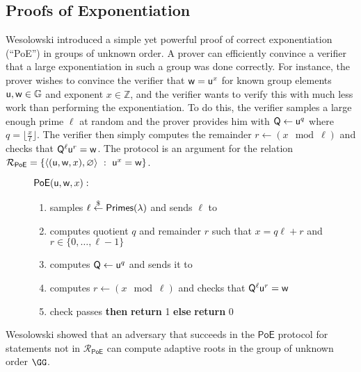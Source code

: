 \documentclass{article}
\theoremstyle{definition}
\begin{document}
\subsection{Proofs of Exponentiation}
Wesolowski \cite{EC:Wesolowski19} introduced a simple yet powerful proof of correct exponentiation (``PoE'') in groups of unknown order. A prover can efficiently convince a verifier that a large exponentiation in such a group was done correctly. For instance, the prover wishes to convince the verifier that $\mathsf{w} = \mathsf{u}^x$ for known group elements $\mathsf{u}, \mathsf{w} \in \mathbb{G}$ and exponent $x \in \mathbb{Z}$, and the verifier wants to verify this with much less work than performing the exponentiation. To do this, the verifier samples a large enough prime $\ell$ at random and the prover provides him with $\mathsf{Q} \gets \mathsf{u}^q$ where $q = \lfloor \frac{x}{\ell} \rfloor$. The verifier then simply computes the remainder $r \gets (x \mod \ell)$ and checks that $\mathsf{Q}^\ell\mathsf{u}^r = \mathsf{w}$. The protocol is an argument for the relation $\mathcal{R}_\mathsf{PoE} = \left\{ \langle(\mathsf{u}, \mathsf{w}, x), \varnothing\rangle \ : \ \mathsf{u}^x = \mathsf{w} \right\}$.

\begin{figure}[!htp]
\noindent\begin{mdframed}[userdefinedwidth=\textwidth]
\begin{minipage}{\textwidth}
	\begin{flushleft}
	$\textsf{{PoE}}(\mathsf{u}, \mathsf{w}, x):$
	\begin{enumerate}[nolistsep]
		    \item \verifier samples $\ell \overset{\$}{\gets} \textsf{Primes}(\lambda)$ and sends $\ell$ to \prover
		    \item \prover computes quotient $q$ and remainder $r$ such that $x = q\ell + r$ and $r \in \{0, \ldots, \ell-1\}$
		    \item \prover computes $\mathsf{Q} \gets \mathsf{u}^q$ and sends it to \verifier
		    \item \verifier computes $r \gets (x \mod \ell)$ and checks that $\mathsf{Q}^\ell\mathsf{u}^r = \mathsf{w}$
		    \item \pcif{}check passes \textbf{then} \textbf{return} 1 \textbf{else} \textbf{return} 0
		\end{enumerate}
	\end{flushleft}
\end{minipage}
\end{mdframed}
\end{figure}
Wesolowski showed that an adversary that succeeds in the $\textsf{PoE}$ protocol for statements not in $\mathcal{R}_{\textsf{PoE}}$ can compute adaptive roots in the group of unknown order $\GG$.
\end{document}
